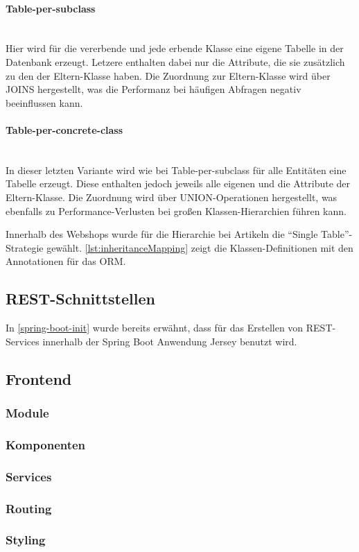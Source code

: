 \paragraph{Table-per-subclass}$\;$ \\
Hier wird für die vererbende und jede erbende Klasse eine eigene Tabelle in der Datenbank erzeugt. Letzere enthalten dabei nur die Attribute, die sie zusätzlich zu den der Eltern-Klasse haben. Die Zuordnung zur Eltern-Klasse wird über JOINS hergestellt, was die Performanz bei häufigen Abfragen negativ beeinflussen kann.
\paragraph{Table-per-concrete-class}$\;$ \\
In dieser letzten Variante wird wie bei Table-per-subclass für alle Entitäten eine Tabelle erzeugt. Diese enthalten jedoch jeweils alle eigenen und die Attribute der Eltern-Klasse.
Die Zuordnung wird über UNION-Operationen hergestellt, was ebenfalls zu Performance-Verlusten bei großen Klassen-Hierarchien führen kann.

Innerhalb des Webshops wurde für die Hierarchie bei Artikeln die \enquote{Single Table}-Strategie gewählt.
\cref{lst:inheritanceMapping} zeigt die Klassen-Definitionen mit den Annotationen für das \acs{ORM}.



\subsection{REST-Schnittstellen}

In \cref{spring-boot-init} wurde bereits erwähnt, dass für das Erstellen von REST-Services innerhalb der Spring Boot Anwendung Jersey benutzt wird. 

\subsection{Frontend}

\subsubsection{Module}

\subsubsection{Komponenten}

\subsubsection{Services}

\subsubsection{Routing}

\subsubsection{Styling}

